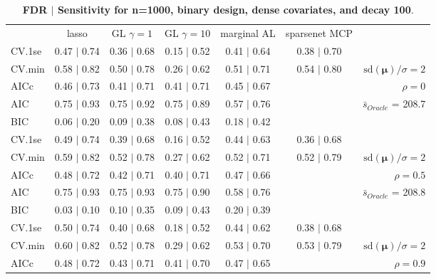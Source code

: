 \clearpage
\begin{table}\vspace{-.5cm}
\caption[l]{ {\it }
{ \bf FDR $\boldsymbol{\mid}$ Sensitivity for n=1000, binary design, dense covariates, and  decay  100}.}
\vspace{-.5cm}
\footnotesize{}
\begin{center}
\begin{tabular}{l*{5}{c}|r}
 & lasso & GL $\gamma=1$ & GL $\gamma=10$ & marginal AL & sparsenet MCP  & \\
 \cline{1-7}
CV.1se & 0.47 $\mid$ 0.74 & 0.36 $\mid$ 0.68 & 0.15 $\mid$ 0.52 & 0.41 $\mid$ 0.64 & 0.38 $\mid$ 0.70 & \\
CV.min & 0.58 $\mid$ 0.82 & 0.50 $\mid$ 0.78 & 0.26 $\mid$ 0.62 & 0.51 $\mid$ 0.71 & 0.54 $\mid$ 0.80 &  $\mathrm{sd}(\mathbf{\mu})/\sigma=2$ \\
AICc & 0.46 $\mid$ 0.73 & 0.41 $\mid$ 0.71 & 0.41 $\mid$ 0.71 & 0.45 $\mid$ 0.67 & & $\rho=0$ \\
AIC & 0.75 $\mid$ 0.93 & 0.75 $\mid$ 0.92 & 0.75 $\mid$ 0.89 & 0.57 $\mid$ 0.76 & &  \multirow{2}{*}{$\bar{s}_{Oracle}$ = 208.7} \\
BIC & 0.06 $\mid$ 0.20 & 0.09 $\mid$ 0.38 & 0.08 $\mid$ 0.43 & 0.18 $\mid$ 0.42 & &  \\
 \hline 
CV.1se & 0.49 $\mid$ 0.74 & 0.39 $\mid$ 0.68 & 0.16 $\mid$ 0.52 & 0.44 $\mid$ 0.63 & 0.36 $\mid$ 0.68 & \\
CV.min & 0.59 $\mid$ 0.82 & 0.52 $\mid$ 0.78 & 0.27 $\mid$ 0.62 & 0.52 $\mid$ 0.71 & 0.52 $\mid$ 0.79 &  $\mathrm{sd}(\mathbf{\mu})/\sigma=2$ \\
AICc & 0.48 $\mid$ 0.72 & 0.42 $\mid$ 0.71 & 0.40 $\mid$ 0.71 & 0.47 $\mid$ 0.66 & & $\rho=0.5$ \\
AIC & 0.75 $\mid$ 0.93 & 0.75 $\mid$ 0.93 & 0.75 $\mid$ 0.90 & 0.58 $\mid$ 0.76 & &  \multirow{2}{*}{$\bar{s}_{Oracle}$ = 208.8} \\
BIC & 0.03 $\mid$ 0.10 & 0.10 $\mid$ 0.35 & 0.09 $\mid$ 0.43 & 0.20 $\mid$ 0.39 & &  \\
 \hline 
CV.1se & 0.50 $\mid$ 0.74 & 0.40 $\mid$ 0.68 & 0.18 $\mid$ 0.52 & 0.44 $\mid$ 0.62 & 0.38 $\mid$ 0.68 & \\
CV.min & 0.60 $\mid$ 0.82 & 0.52 $\mid$ 0.78 & 0.29 $\mid$ 0.62 & 0.53 $\mid$ 0.70 & 0.53 $\mid$ 0.79 &  $\mathrm{sd}(\mathbf{\mu})/\sigma=2$ \\
AICc & 0.48 $\mid$ 0.72 & 0.43 $\mid$ 0.71 & 0.41 $\mid$ 0.70 & 0.47 $\mid$ 0.65 & & $\rho=0.9$ \\

\end{tabular}
\end{center}
\end{table}
